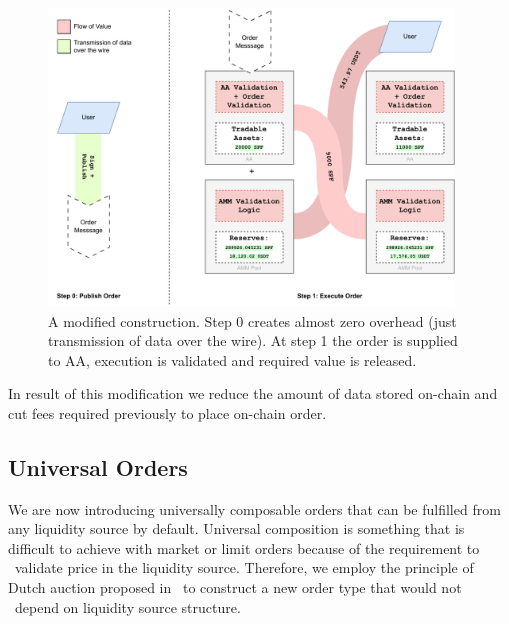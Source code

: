 \documentclass[11pt]{article}
\begin{document}
\begin{sloppypar}
        \begin{figure}[h]
            \centering
            \includegraphics[width=0.96\textwidth]{pool+offchain_order}
            \caption{A modified construction. Step 0 creates almost zero overhead (just transmission of data over the wire).
            At step 1 the order is supplied to AA, execution is validated and required value is released.}
            \label{fig:figure3}
        \end{figure}

        In result of this modification we reduce the amount of data stored on-chain and cut fees required previously to place on-chain order.

        \subsection{Universal Orders}\label{subsec:dutch-orders}
        We are now introducing universally composable orders that can be fulfilled from any liquidity source by default.
        Universal composition is something that is difficult to achieve with market or limit orders because of the requirement to \
        validate price in the liquidity source.
        Therefore, we employ the principle of Dutch auction proposed in~\cite{uniswap2023x} to construct a new order type that would not \
        depend on liquidity source structure.


\end{sloppypar}
\end{document}

